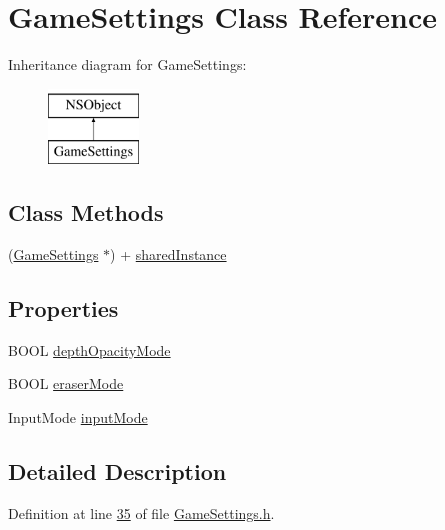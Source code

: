 \hypertarget{interface_game_settings}{\section{Game\-Settings Class Reference}
\label{d1/d0c/interface_game_settings}
}
Inheritance diagram for Game\-Settings\-:\begin{figure}[H]
\begin{center}
\leavevmode
\includegraphics[height=2.000000cm]{d1/d0c/interface_game_settings}
\end{center}
\end{figure}
\subsection*{Class Methods}
\begin{DoxyCompactItemize}
\item 
(\hyperlink{interface_game_settings}{Game\-Settings} $\ast$) + \hyperlink{interface_game_settings_abdcc2e77ea14381a85c6de67c83df624}{shared\-Instance}
\end{DoxyCompactItemize}
\subsection*{Properties}
\begin{DoxyCompactItemize}
\item 
B\-O\-O\-L \hyperlink{interface_game_settings_a1ac5ddcb61e46f952ccd0e876a8578a4}{depth\-Opacity\-Mode}
\item 
B\-O\-O\-L \hyperlink{interface_game_settings_ab192ff4717d84e69f4e3a32a4e38d6b8}{eraser\-Mode}
\item 
Input\-Mode \hyperlink{interface_game_settings_a57e428fbdeeb3dbffa09bb7ffcf6b057}{input\-Mode}
\end{DoxyCompactItemize}


\subsection{Detailed Description}


Definition at line \hyperlink{_game_settings_8h_source_l00035}{35} of file \hyperlink{_game_settings_8h_source}{Game\-Settings.\-h}.



